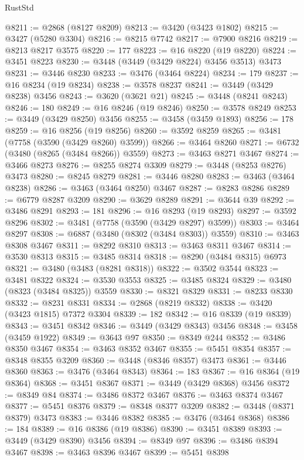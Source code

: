 \begin{lexlean}{RustStd}
\begin{coremodule}
{{{{{{{{{{{{{{{{{{{@8211 := @2868 (@8127 @8209)
@8213 := @3420 (@3423 @1802)
@8215 := @3427 (@5280 @3304)
@8216 := @8215 @7742
@8217 := @7900 @8216
@8219 := @8213 @8217 @3575
@8220 := 177
@8223 := @16 @8220 (@19 @8220)
@8224 := @3451 @8223
@8230 := @3448 (@3449 (@3429 @8224) @3456 @3513) @3473
@8231 := @3446 @8230
@8233 := @3476 (@3464 @8224)
@8234 := 179
@8237 := @16 @8234 (@19 @8234)
@8238 := @3578 @8237
@8241 := @3449 (@3429 @8238) @3456
@8243 := @3620 (@3621 @21)
@8245 := @3448 (@8241 @8243)
@8246 := 180
@8249 := @16 @8246 (@19 @8246)
@8250 := @3578 @8249
@8253 := @3449 (@3429 @8250) @3456
@8255 := @3458 (@3459 @1893)
@8256 := 178
@8259 := @16 @8256 (@19 @8256)
@8260 := @3592 @8259
@8265 := @3481 (@7758 (@3590 (@3429 @8260) @3599))
@8266 := @3464 @8260
@8271 := @6732 (@3480 (@8265 (@3484 @8266)) @3559)
@8273 := @3463 @8271 @3467
@8274 := @3466 @8273
@8276 := @8255 @8274 @3309
@8279 := @3448 (@8253 @8276) @3473
@8280 := @8245 @8279
@8281 := @3446 @8280
@8283 := @3463 (@3464 @8238)
@8286 := @3463 (@3464 @8250) @3467
@8287 := @8283 @8286
@8289 := @6779 @8287 @3209
@8290 := @3629 @8289
@8291 := @3644 @39
@8292 := @3486 @8291
@8293 := 181
@8296 := @16 @8293 (@19 @8293)
@8297 := @3592 @8296
@8302 := @3481 (@7758 (@3590 (@3429 @8297) @3599))
@8303 := @3464 @8297
@8308 := @6887 (@3480 (@8302 (@3484 @8303)) @3559)
@8310 := @3463 @8308 @3467
@8311 := @8292 @8310
@8313 := @3463 @8311 @3467
@8314 := @3530 @8313
@8315 := @3485 @8314
@8318 := @8290 (@3484 @8315) @6973
@8321 := @3480 (@3483 (@8281 @8318))
@8322 := @3502 @3544
@8323 := @3481 @8322
@8324 := @3530 @3553
@8325 := @3485 @8324
@8329 := @3480 (@8323 (@3484 @8325)) @3559
@8330 := @8321 @8329
@8331 := @8233 @8330
@8332 := @8231 @8331
@8334 := @2868 (@8219 @8332)
@8338 := @3420 (@3423 @1815) @7372 @3304
@8339 := 182
@8342 := @16 @8339 (@19 @8339)
@8343 := @3451 @8342
@8346 := @3449 (@3429 @8343) @3456
@8348 := @3458 (@3459 @1922)
@8349 := @3643 @97
@8350 := @8349 @244
@8352 := @3486 @8350 @3467
@8354 := @3463 @8352 @3467
@8355 := @5451 @8354
@8357 := @8348 @8355 @3209
@8360 := @3448 (@8346 @8357) @3473
@8361 := @3446 @8360
@8363 := @3476 (@3464 @8343)
@8364 := 183
@8367 := @16 @8364 (@19 @8364)
@8368 := @3451 @8367
@8371 := @3449 (@3429 @8368) @3456
@8372 := @8349 @84
@8374 := @3486 @8372 @3467
@8376 := @3463 @8374 @3467
@8377 := @5451 @8376
@8379 := @8348 @8377 @3209
@8382 := @3448 (@8371 @8379) @3473
@8383 := @3446 @8382
@8385 := @3476 (@3464 @8368)
@8386 := 184
@8389 := @16 @8386 (@19 @8386)
@8390 := @3451 @8389
@8393 := @3449 (@3429 @8390) @3456
@8394 := @8349 @97
@8396 := @3486 @8394 @3467
@8398 := @3463 @8396 @3467
@8399 := @5451 @8398
}}}}}}}}}}}}}}}}}}}
\end{coremodule}
\end{lexlean}
